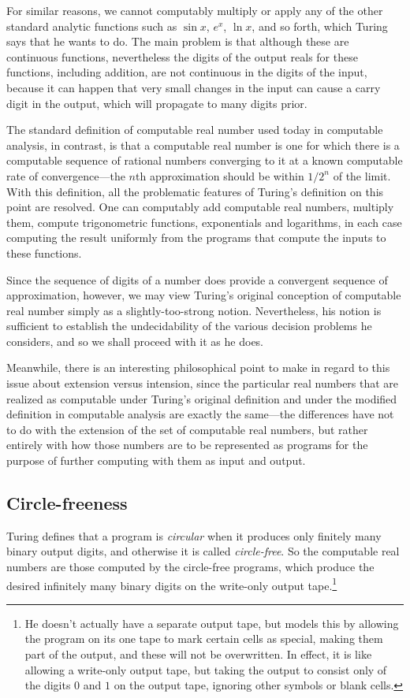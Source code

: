 \documentclass[12pt]{amsart}
\begin{document}
For similar reasons, we cannot computably multiply or apply any of the other standard analytic functions such as $\sin x$, $e^x$, $\ln x$, and so forth, which Turing says that he wants to do. The main problem is that although these are continuous functions, nevertheless the digits of the output reals for these functions, including addition, are not continuous in the digits of the input, because it can happen that very small changes in the input can cause a carry digit in the output, which will propagate to many digits prior.

The standard definition of computable real number used today in computable analysis, in contrast, is that a computable real number is one for which there is a computable sequence of rational numbers converging to it at a known computable rate of convergence---the $n$th approximation should be within $1/2^n$ of the limit. With this definition, all the problematic features of Turing's definition on this point are resolved. One can computably add computable real numbers, multiply them, compute trigonometric functions, exponentials and logarithms, in each case computing the result uniformly from the programs that compute the inputs to these functions.

Since the sequence of digits of a number does provide a convergent sequence of approximation, however, we may view Turing's original conception of computable real number simply as a slightly-too-strong notion. Nevertheless, his notion is sufficient to establish the undecidability of the various decision problems he considers, and so we shall proceed with it as he does.

Meanwhile, there is an interesting philosophical point to make in regard to this issue about extension versus intension, since the particular real numbers that are realized as computable under Turing's original definition and under the modified definition in computable analysis are exactly the same---the differences have not to do with the extension of the set of computable real numbers, but rather entirely with how those numbers are to be represented as programs for the purpose of further computing with them as input and output.

\subsection{Circle-freeness}

Turing defines that a program is \emph{circular} when it produces only finitely many binary output digits, and otherwise it is called \emph{circle-free}. So the computable real numbers are those computed by the circle-free programs, which produce the desired infinitely many binary digits on the write-only output tape.\footnote{He doesn't actually have a separate output tape, but models this by allowing the program on its one tape to mark certain cells as special, making them part of the output, and these will not be overwritten. In effect, it is like allowing a write-only output tape, but taking the output to consist only of the digits $0$ and $1$ on the output tape, ignoring other symbols or blank cells.}
\end{document}
